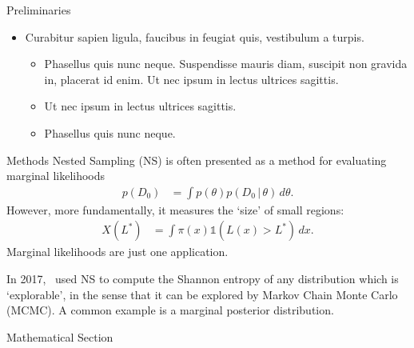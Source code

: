 \documentclass[final,hyperref={pdfpagelabels=false}]{beamer}
\newcommand{\given}{\,|\,}
\begin{document}
\begin{frame}[t]
\begin{columns}[t]
\begin{column}{.465\textwidth}
\begin{block}{Preliminaries}
\begin{itemize}
\item Curabitur sapien ligula, faucibus in feugiat quis, vestibulum a turpis.
\begin{itemize}
\item Phasellus quis nunc neque. Suspendisse mauris diam, suscipit non gravida in, placerat id enim. Ut nec ipsum in lectus ultrices sagittis.
\item Ut nec ipsum in lectus ultrices sagittis.
\item Phasellus quis nunc neque.
\end{itemize}
\end{itemize}

\end{block}


\begin{block}{Methods}
Nested Sampling (NS) is often presented as a method for evaluating marginal
likelihoods
\begin{align}
p(D_0) &= \int p(\theta)p(D_0 \given \theta) \, d\theta.
\end{align}
However, more fundamentally, it measures the `size' of small regions:
\begin{align}
X(L^*) &= \int \pi(x) \mathds{1}\left(L(x) > L^*\right) \, dx.
\end{align}
Marginal likelihoods are just one application.

In 2017, \citep{brewer}~used NS to compute the Shannon entropy of any
distribution which is `explorable', in the sense that it can be explored
by Markov Chain Monte Carlo (MCMC). A common example is a marginal
posterior distribution.

\end{block}


\begin{block}{Mathematical Section}


\end{block}
\end{column}
\end{columns}
\end{frame}
\end{document}
